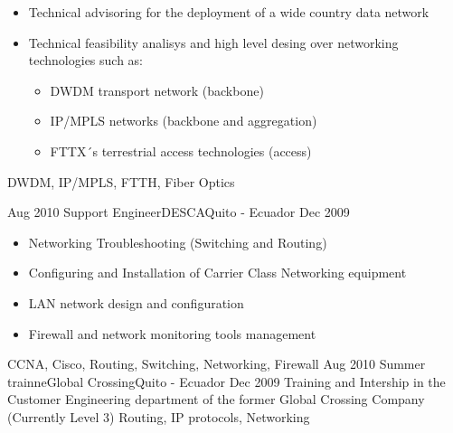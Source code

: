 \begin{experiences}
{                      \begin{itemize}
                        \item Technical advisoring for the deployment of a wide country data network
                        \item Technical feasibility analisys and high level desing over networking technologies such as:
                        \begin{itemize}
                        \item DWDM transport network (backbone)
                        \item IP/MPLS networks (backbone and aggregation)
                        \item FTTX´s terrestrial access technologies (access)                                            
                        \end{itemize}
                      \end{itemize}
                  }
                  {DWDM, IP/MPLS, FTTH, Fiber Optics}  

  \emptySeparator         
  \experience
  {Aug 2010}  {Support Engineer}{DESCA}{Quito - Ecuador}
  {Dec 2009}   {
                      \begin{itemize}
                        \item Networking Troubleshooting (Switching and Routing)
                        \item Configuring and Installation of Carrier Class Networking equipment
                        \item LAN network design and configuration
                        \item Firewall and network monitoring tools management
                      \end{itemize}
                }
                  {CCNA, Cisco, Routing, Switching, Networking, Firewall} 
  \emptySeparator         
  \experience
  {Aug 2010}  {Summer trainne}{Global Crossing}{Quito - Ecuador}
  {Dec 2009}   {
                Training and Intership in the Customer Engineering department of the former Global Crossing Company (Currently Level 3)
                }
                  {Routing, IP protocols, Networking} 
\end{experiences}

